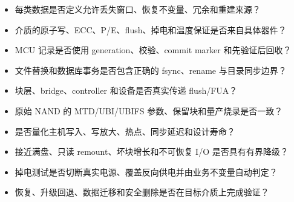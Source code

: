 \begin{itemize}
  \item 每类数据是否定义允许丢失窗口、恢复不变量、冗余和重建来源？
  \item 介质的原子写、ECC、P/E、flush、掉电和温度保证是否来自具体器件？
  \item MCU 记录是否使用 generation、校验、commit marker 和先验证后回收？
  \item 文件替换和数据库事务是否包含正确的 fsync、rename 与目录同步边界？
  \item 块层、bridge、controller 和设备是否真实传递 flush/FUA？
  \item 原始 NAND 的 MTD/UBI/UBIFS 参数、保留块和量产烧录是否一致？
  \item 是否量化主机写入、写放大、热点、同步延迟和设计寿命？
  \item 接近满盘、只读 remount、坏块增长和不可恢复 I/O 是否具有有界降级？
  \item 掉电测试是否切断真实电源、覆盖反向供电并由业务不变量自动判定？
  \item 恢复、升级回退、数据迁移和安全删除是否在目标介质上完成验证？
\end{itemize}
